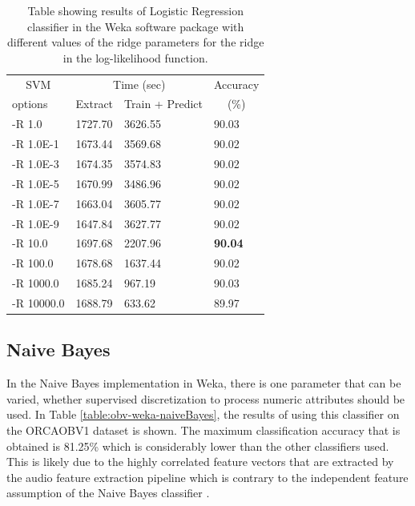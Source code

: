 \begin{table}
\begin{tabular}{|l|l|l|l|}
\hline
\multicolumn{1}{|c|}{SVM} & \multicolumn{2}{c|}{Time (sec)} & Accuracy \\
\hhline{|~|-|-|~|}
options & Extract & Train + Predict & \multicolumn{1}{c|}{(\%)} \\
\hhline{|=|=|=|=|}
-R 1.0      &  1727.70  &    3626.55  &  90.03  \\
-R 1.0E-1   &  1673.44  &    3569.68  &  90.02  \\
-R 1.0E-3   &  1674.35  &    3574.83  &  90.02  \\
-R 1.0E-5   &  1670.99  &    3486.96  &  90.02  \\
-R 1.0E-7   &  1663.04  &    3605.77  &  90.02  \\
-R 1.0E-9   &  1647.84  &    3627.77  &  90.02  \\
-R 10.0     &  1697.68  &    2207.96  &  \textbf{90.04}  \\
-R 100.0    &  1678.68  &    1637.44  &  90.02  \\
-R 1000.0   &  1685.24  &     967.19  &  90.03  \\
-R 10000.0  &  1688.79  &     633.62  &  89.97  \\
\hline
\end{tabular}
\caption{Table showing results of Logistic Regression classifier in
  the Weka software package with different values of the ridge
  parameters for the ridge in the log-likelihood function.}
\label{table:obv-weka-logistic}
\end{table}

%
%
\subsection{Naive Bayes}

In the Naive Bayes implementation in Weka, there is one parameter that
can be varied, whether supervised discretization to process numeric
attributes should be used.  In Table \ref{table:obv-weka-naiveBayes},
the results of using this classifier on the ORCAOBV1 dataset is shown.
The maximum classification accuracy that is obtained is 81.25\% which
is considerably lower than the other classifiers used.  This is likely
due to the highly correlated feature vectors that are extracted by the
audio feature extraction pipeline which is contrary to the independent
feature assumption of the Naive Bayes classifier
\cite{john1995estimating}.

